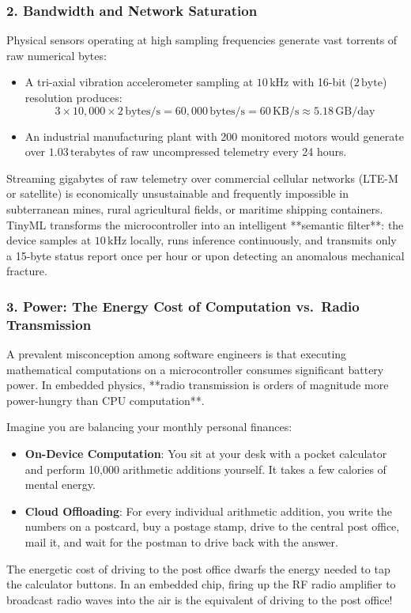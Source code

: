 \subsubsection{2. Bandwidth and Network Saturation}
Physical sensors operating at high sampling frequencies generate vast torrents of raw numerical bytes:
\begin{itemize}
    \item A tri-axial vibration accelerometer sampling at $10\,\text{kHz}$ with 16-bit ($2\,\text{byte}$) resolution produces:
    \begin{equation*}
    3 \times 10{,}000 \times 2\,\text{bytes/s} = 60{,}000\,\text{bytes/s} = 60\,\text{KB/s} \approx 5.18\,\text{GB/day}
    \end{equation*}
    \item An industrial manufacturing plant with 200 monitored motors would generate over $1.03\,\text{terabytes}$ of raw uncompressed telemetry every 24 hours.
\end{itemize}
Streaming gigabytes of raw telemetry over commercial cellular networks (LTE-M or satellite) is economically unsustainable and frequently impossible in subterranean mines, rural agricultural fields, or maritime shipping containers. TinyML transforms the microcontroller into an intelligent **semantic filter**: the device samples at $10\,\text{kHz}$ locally, runs inference continuously, and transmits only a 15-byte status report once per hour or upon detecting an anomalous mechanical fracture.

\subsubsection{3. Power: The Energy Cost of Computation vs.\ Radio Transmission}
A prevalent misconception among software engineers is that executing mathematical computations on a microcontroller consumes significant battery power. In embedded physics, **radio transmission is orders of magnitude more power-hungry than CPU computation**.

\begin{analogy}
Imagine you are balancing your monthly personal finances:
\begin{itemize}
    \item \textbf{On-Device Computation}: You sit at your desk with a pocket calculator and perform 10,000 arithmetic additions yourself. It takes a few calories of mental energy.
    \item \textbf{Cloud Offloading}: For every individual arithmetic addition, you write the numbers on a postcard, buy a postage stamp, drive to the central post office, mail it, and wait for the postman to drive back with the answer.
\end{itemize}
The energetic cost of driving to the post office dwarfs the energy needed to tap the calculator buttons. In an embedded chip, firing up the RF radio amplifier to broadcast radio waves into the air is the equivalent of driving to the post office!
\end{analogy}


